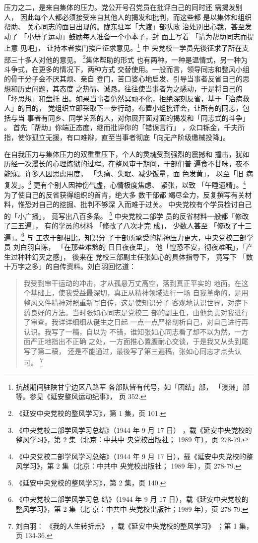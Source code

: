 压力之二，是来自集体的压力。党公开号召党员在批评白己的同时还 需揭发别人，
因此每个人都必须接受来自其他人的揭发和批判，而这些都 是以集体和组织帮助、
关心同志的面目出现的。陇东驻军「大渡」部队政 治处别出心裁，甚至发动了
「小册子运动」鼓励每人准备一个小本子，封 面上写着 「请为帮助同志而提上意
见吧」， 让持本者挨门挨户征求意见。\footnote{抗战期间驻陕甘宁边区八路军
各部队皆有代号，如「团结」部， 「澳洲」部等。参见《延安整风运动纪事》，
页 352. } 中 央党校一学员先後征求了所在支部三十多人对他的意见。
\footnote{《延安中央党校的整风学习》，第 1 集，页 101.}集体帮助的形式
也有两种，一种是温情式，另一种为斗争式，在更多的情况下，两种方式
交替使用。一般而言，领导同志和整风小组的骨干分子会不厌其烦、亲自
登门，苦口婆心地启发、引导当事者反省自己的思想和历史问题，其态度
之热情、诚恳。往往使当事者为之感动，于是将自己的「坏思想」和盘托
出。如果当事者仍然冥顽不化，拒绝深刻反省，基于「治病救人」的目的，
党组织立即采取下一步行动，布置小组批评会，让所有的同志，包括与当
事者有同乡、同学关系的人，对你展开面对面的揭发和「同志式的斗争」
。
首先「帮助」你端正态度，继而批评你的「错误言行」
，众口铄金，千夫所
指，使你孤立无援，有口难辩，直至当事者彻底「向无产阶级缴械投降」。


在自我压力与集体压力的双重重压下，个人的灵魂受到强烈的震撼和 撞击，犹如
历经一次漫长的心理炼狱的过程。在整风审干期间，干部们普 遍食不甘味，夜不
能寐。许多人因思虑用度， 「头痛、失眠、减少饭量，面 色发黄」， 以至「旧
病复发」。\footnote{《中央党校二部学风学习总结》（1944 年 9 月 17 日）
，载《延安中央党校的整风学习》，第 2 集（北京：中共中 央党校出版社；
1989 年），页 278-79.}  更有个别人因神伤气虚，心情极度焦虑、 紧张，以致
「午睡遗精」。\footnote{《中央党校二部学风学习总结》（1944 年 9 月 17
日），载《延安中央党校的整风学习》，第 2 集（北京：中共中 央党校出版社；
1989 年），页 278-79.} 为了使自己的反省获得组织的首肯，绝大多 数干部都
竭尽全力，反复撰写有关材料，惟恐对自己的挖掘、批判不够深 入而难于过关。
中央党校有个学员检讨自己的「小广播」， 竟写出八百多条。
\footnote{ 《延安中央党校的整风学习》，第 2 集，页 140.} 中央党校二部学
员的反省材料一般都「修改了三五遍」， 有的学员的材料 「修改了八次才完
成」， 少数人甚至 「修改了十三遍」。\footnote{《中央党校二部学风学习总
结》（1944 年 9 月 17 日），载《延安中央党校的整风学习》，第 2 集（北
京：中共中 央党校出版社；1989 年），页 278-79.} 与 工农干部相比，知识分
子干部所承受的精神压力更大，中央党校三部学员 刘白羽自陈， 「在那些难熬的
日日夜夜里」， 他「惶恐不安，彻夜难眠」，「产 生过种种幻灭之感」， 後来在
党校三部副主任张如心的具体指导下，
竟写下
「数十万字之多」的自传资料。刘白羽回忆道：
\begin{quote}
{\fzwkai 我受到审干运动的冲击，才从孤悬万丈高空，落到真正平实的
地面。在这个基础上，使我受益最深切，真正从精神领域进行一场
自我革命的，是用整风文件精神对照重新写自传，这是使知识分子
客观地认识世界，对症下药良好的方法。当时张如心同志是党校三
部的副主任，由他负责对我进行了审查。我详详细细从诞生之日起
一点一点严格剖析自己，对自己进行再认识。我写了一稿，自以为
不错，谁知张如心同志看了却不以为然，一方面严正地指出不正确
之处，一方面推心置腹耐心交谈，于是我又从头到尾写了第二稿，
还是不能通过，最後写了第三遍稿，张如心同志才点头认可。
\footnote{刘白羽： 《我的人生转折点》
，载《延安中央党校的整风学习》
；第 1 集，页 134-36.}} 
\end{quote}

